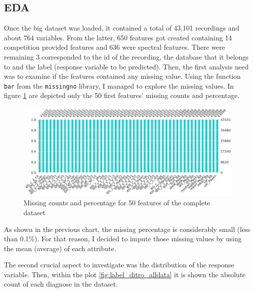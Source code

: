 \subsection{EDA}

Once the big dataset was loaded, it contained a total of 43,101 recordings and about 764 variables. From the latter, 650 features got created containing 14 competition provided features and 636 were spectral features. There were remaining 3 corresponded to the id of the recording, the database that it belongs to and the label (response variable to be predicted). Then, the first analysis need was to examine if the features contained any missing value. Using the function \texttt{bar} from the \texttt{missingno} library, I managed to explore the missing values. In figure \ref{fig:eda_missing} are depicted only the 50 first features' missing counts and percentage.

\begin{figure}[H]
\centering
\includegraphics[scale=0.32]{img/eda_missing.png}
\caption{Missing counts and percentage for 50 features of the complete dataset}
\label{fig:eda_missing}
\end{figure}

As shown in the previous chart, the missing percentage is considerably small (less than 0.1\%). For that reason, I decided to impute those missing values by using the mean (average) of each attribute. 

The second crucial aspect to investigate was the distribution of the response variable. Then, within the plot \ref{fig:label_ditro_alldata} it is shown the absolute count of each diagnose in the dataset.


